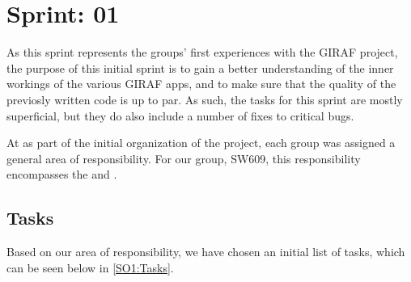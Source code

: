 \chapter{Sprint: 01}
As this sprint represents the groups' first experiences with the GIRAF
project, the purpose of this initial sprint is to gain a better understanding of
the inner workings of the various GIRAF apps, and to make sure that the quality
of the previosly written code is up to par. As such, the tasks for this sprint
are mostly superficial, but they do also include a number of fixes to critical
bugs.\nl

At as part of the initial organization of the project, each group was assigned a
general area of responsibility. For our group, SW609, this responsibility
encompasses the  and .

\section{Tasks}
Based on our area of responsibility, we have chosen an initial list of tasks,
which can be seen below in \autoref{SO1:Tasks}.

